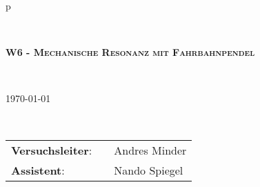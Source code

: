 \begin{tabular}{p{\textwidth}}

\begin{center}
\end{center}


\\

\begin{center}
\Huge{\textsc{
\textbf{W6 - Mechanische Resonanz mit Fahrbahnpendel} \\
}}
\end{center}

\\

\begin{center}
\LARGE{\today}
\end{center}

\\

\vspace*{15cm}


\hrulefill
\begin{flushleft}
\begin{tabular}{lll}
\LARGE \textbf{Versuchsleiter}: & 	\hspace{2cm} & \LARGE Andres Minder\\
\LARGE \textbf{Assistent}: 		& 	\hspace{2cm} & \LARGE Nando Spiegel\\
\end{tabular}
\end{flushleft}
\hrulefill
\end{tabular}
\newpage
